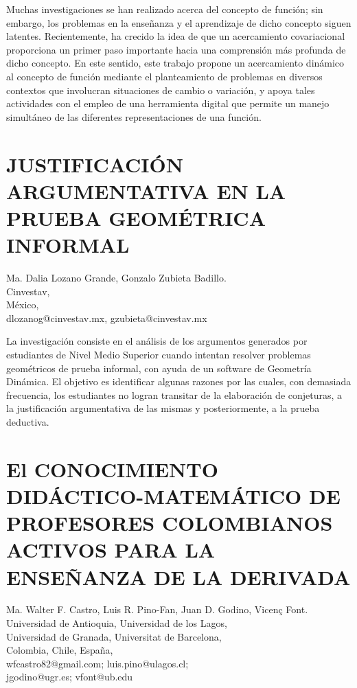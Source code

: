Muchas investigaciones se han realizado acerca del concepto de función;
sin embargo, los problemas en la enseñanza y el aprendizaje de dicho
concepto siguen latentes. Recientemente, ha crecido la idea de que
un acercamiento covariacional proporciona un primer paso importante
hacia una comprensión más profunda de dicho concepto. En este sentido,
este trabajo propone un acercamiento dinámico al concepto de función
mediante el planteamiento de problemas en diversos contextos que involucran
situaciones de cambio o variación, y apoya tales actividades con el
empleo de una herramienta digital que permite un manejo simultáneo
de las diferentes representaciones de una función.


\section{\uppercase{  Justificación argumentativa en la prueba geométrica
informal }}

\begin{datos}
Ma. Dalia Lozano Grande, Gonzalo Zubieta Badillo.\\
Cinvestav, \\
\hfill México, \\
\hfill dlozanog@cinvestav.mx, gzubieta@cinvestav.mx
\end{datos}

La investigación consiste en el análisis de los argumentos generados
por estudiantes de Nivel Medio Superior cuando intentan resolver problemas
geométricos de prueba informal, con ayuda de un software de Geometría
Dinámica. El objetivo es identificar algunas razones por las cuales,
con demasiada frecuencia, los estudiantes no logran transitar de la
elaboración de conjeturas, a la justificación argumentativa de las
mismas y posteriormente, a la prueba deductiva. 


\section{El CONOCIMIENTO DIDÁCTICO-MATEMÁTICO DE PROFESORES COLOMBIANOS ACTIVOS
PARA LA ENSEÑANZA DE LA DERIVADA }

\begin{datos}
Ma. Walter F. Castro, Luis R. Pino-Fan, Juan D. Godino, Vicenç Font.\\
Universidad de Antioquia, Universidad de los Lagos,\\
Universidad de Granada, Universitat de Barcelona,\\
\hfill Colombia, Chile, España, \\
\hfill wfcastro82@gmail.com; luis.pino@ulagos.cl;\\
\hfill jgodino@ugr.es; vfont@ub.edu
\end{datos}


